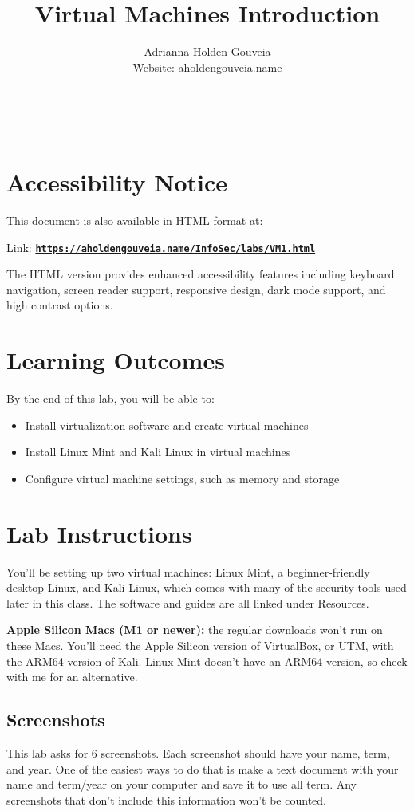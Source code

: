 \documentclass[12pt]{article}
\title{Virtual Machines Introduction}
\author{
        Adrianna Holden-Gouveia \\
        Website: \href{https://aholdengouveia.name}{aholdengouveia.name}\\ 
        \date{\vspace{-5ex}}
        \faGithub {: aholdengouveia} \\
        \faTwitter {: aholdengouveia} \\
        }
\begin{document}
    

\maketitle

\section*{Accessibility Notice}
This document is also available in HTML format at:

Link: \href{https://aholdengouveia.name/InfoSec/labs/VM1.html}{\textbf{\nolinkurl{https://aholdengouveia.name/InfoSec/labs/VM1.html}}}

The HTML version provides enhanced accessibility features including keyboard navigation, screen reader support, responsive design, dark mode support, and high contrast options.


\section*{Learning Outcomes}
By the end of this lab, you will be able to:
\begin{itemize}
    \item Install virtualization software and create virtual machines
    \item Install Linux Mint and Kali Linux in virtual machines
    \item Configure virtual machine settings, such as memory and storage
\end{itemize}

\section*{Lab Instructions}
You'll be setting up two virtual machines: Linux Mint, a beginner-friendly desktop Linux, and Kali Linux, which comes with many of the security tools used later in this class. The software and guides are all linked under Resources.

\textbf{Apple Silicon Macs (M1 or newer):} the regular downloads won't run on these Macs. You'll need the Apple Silicon version of VirtualBox, or UTM, with the ARM64 version of Kali. Linux Mint doesn't have an ARM64 version, so check with me for an alternative.

\subsection*{Screenshots}
This lab asks for 6 screenshots. Each screenshot should have your name, term, and year.  One of the easiest ways to do that is make a text document with your name and term/year on your computer and save it to use all term. Any screenshots that don't include this information won't be counted.
\end{document}
